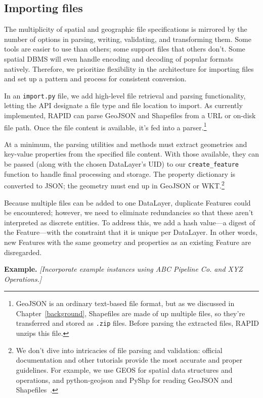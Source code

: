 \subsection{Importing files}
The multiplicity of spatial and geographic file specifications is mirrored by the number of options in parsing, writing, validating, and transforming them. Some tools are easier to use than others; some support files that others don't. Some spatial DBMS will even handle encoding and decoding of popular formats natively. Therefore, we prioritize flexibility in the architecture for importing files and set up a pattern and process for consistent conversion.
 
In an \texttt{import.py} file, we add high-level file retrieval and parsing functionality, letting the API designate a file type and file location to import. As currently implemented, RAPID can parse GeoJSON and Shapefiles from a URL or on-disk file path. Once the file content is available, it's fed into a parser.\footnote{GeoJSON is an ordinary text-based file format, but as we discussed in Chapter~\ref{background}, Shapefiles are made of up multiple files, so they're transferred and stored as \texttt{.zip} files. Before parsing the extracted files, RAPID unzips this file.}

At a minimum, the parsing utilities and methods must extract geometries and key-value properties from the specified file content. With those available, they can be passed (along with the chosen DataLayer's UID) to our \texttt{create\_feature} function to handle final processing and storage. The property dictionary is converted to JSON; the geometry must end up in GeoJSON or WKT.\footnote{We don't dive into intricacies of file parsing and validation: official documentation and other tutorials provide the most accurate and proper guidelines. For example, we use GEOS for spatial data structures and operations, and python-geojson and PyShp for reading GeoJSON and Shapefiles~\cite{GEOS,Farwell2014,pyshp}.}

Because multiple files can be added to one DataLayer, duplicate Features could be encountered; however, we need to eliminate redundancies so that these aren't interpreted as discrete entities. To address this, we add a hash value---a digest of the Feature---with the constraint that it is unique per DataLayer. In other words, new Features with the same geometry and properties as an existing Feature are disregarded.

\textbf{Example.} \textit{[Incorporate example instances using ABC Pipeline Co. and XYZ Operations.]}

